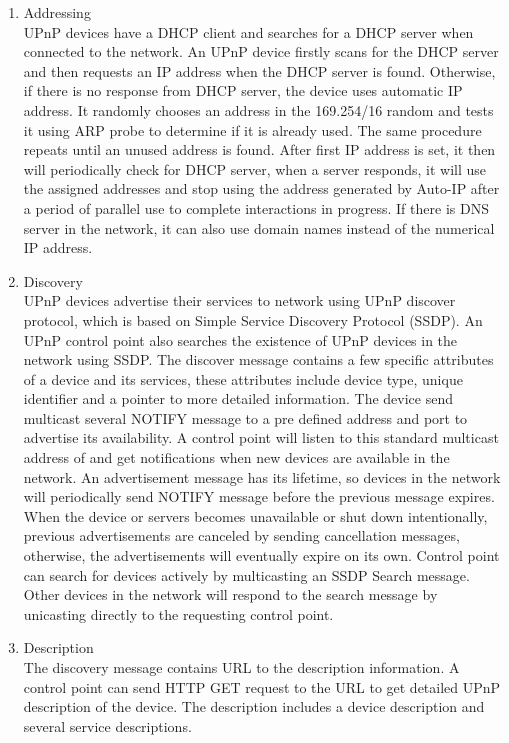 \begin{enumerate}
\item Addressing \\
UPnP devices have a DHCP client and searches for a DHCP server when connected to the network. 
An UPnP device firstly scans for the DHCP server and then requests an IP address when the DHCP 
server is found. Otherwise, if there is no response from DHCP server, the device uses automatic 
IP address. It randomly chooses an address in the 169.254/16 random and tests it using ARP probe 
to determine if it is already used. The same procedure repeats until an unused address is found. 
After first IP address is set, it then will periodically check for DHCP server, when a server 
responds, it will use the assigned addresses and stop using the address generated by Auto-IP 
after a period of parallel use to complete interactions in progress.
If there is DNS server in the network, it can also use domain names instead of the numerical IP address.
\item Discovery \\
UPnP devices advertise their services to network using UPnP discover protocol, which is based on 
Simple Service Discovery Protocol (SSDP). An UPnP control point also searches the existence of 
UPnP devices in the network using SSDP. The discover message contains a few specific attributes 
of a device and its services, these attributes include device type, unique identifier and a 
pointer to more detailed information.
The device send multicast several NOTIFY message to a pre defined address and port to advertise 
its availability. A control point will listen to this standard multicast address of and get 
notifications when new devices are available in the network.
An advertisement message has its lifetime, so devices in the network will periodically send 
NOTIFY message before the previous message expires. When the device or servers becomes unavailable 
or shut down intentionally, previous advertisements are canceled by sending cancellation messages, 
otherwise, the advertisements will eventually expire on its own.
Control point can search for devices actively by multicasting an SSDP Search message. Other devices 
in the network will respond to the search message by unicasting directly to the requesting control point.
\item Description \\
The discovery message contains URL to the description information. A control point can send HTTP 
GET request to the URL to get detailed UPnP description of the device. The description includes 
a device description and several service descriptions. 


\end{enumerate}
